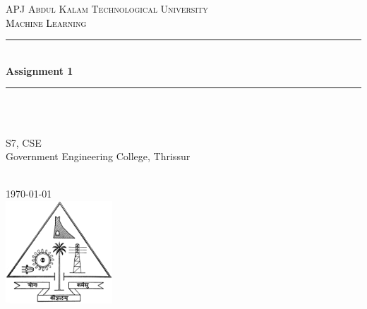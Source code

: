 \begin{titlepage}
\newcommand{\HRule}{\rule{\linewidth}{0.5mm}}


\center
    \textsc{\LARGE APJ Abdul Kalam Technological University\\[1.3cm]}
    \textsc{\Large \textcolor{black}{Machine Learning}}\\[0.2cm]
    
    \HRule \\[0.4cm]
    { \huge \bfseries \textcolor{DeepMagenta}{Assignment 1}}\\[0.4cm]
    \HRule \\[1.5cm]
 
    \begin{minipage}{0.4\textwidth}
    \begin{center} \large
    \emph{ }\\
        S7, CSE \\
        Government Engineering College, Thrissur
    \end{center}
    \end{minipage} \\[2cm]
    
    {\large \today}\\[2cm] 

    \includegraphics[width=40mm,scale=0.5]{Images/KTU_Logo.png}
\vfill 
\end{titlepage}